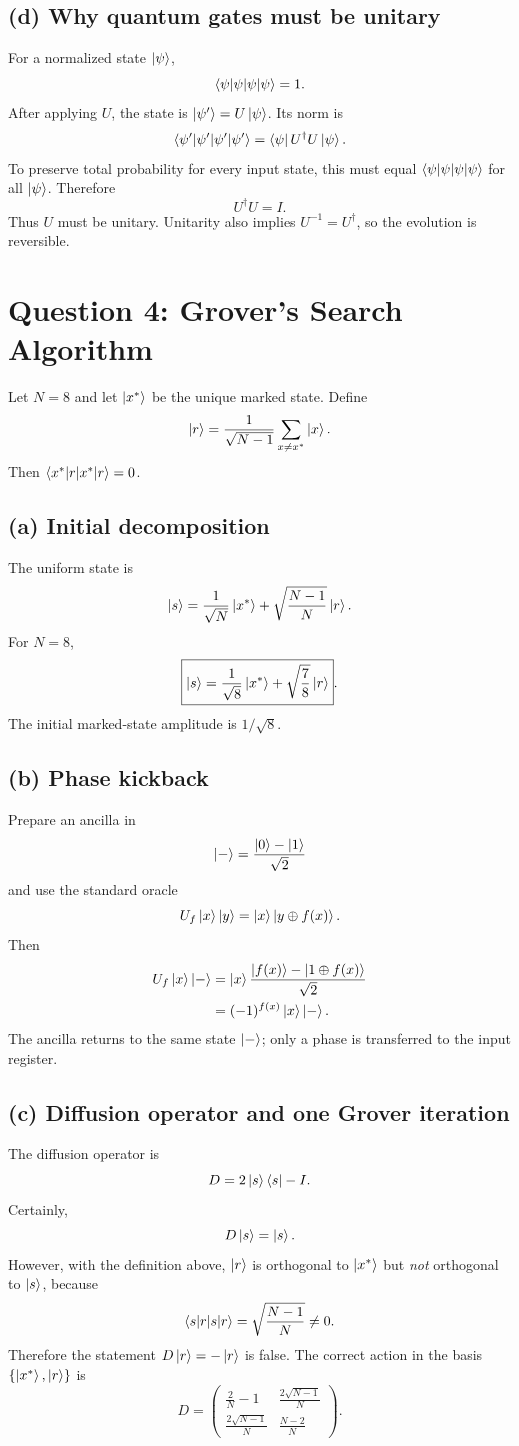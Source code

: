 \documentclass[11pt,a4paper]{article}
\begin{document}
\subsection*{(d) Why quantum gates must be unitary}
For a normalized state $\ket\psi$,
\[
\braket{\psi|\psi}=1.
\]
After applying $U$, the state is $\ket{\psi'}=U\ket\psi$. Its norm is
\[
\braket{\psi'|\psi'}
=\bra\psi U^\dagger U\ket\psi.
\]
To preserve total probability for every input state, this must equal
$\braket{\psi|\psi}$ for all $\ket\psi$. Therefore
\[
U^\dagger U=I.
\]
Thus $U$ must be unitary. Unitarity also implies $U^{-1}=U^\dagger$, so the evolution is reversible.

\newpage
\section*{Question 4: Grover's Search Algorithm}

Let $N=8$ and let $\ket{x^*}$ be the unique marked state. Define
\[
\ket{r}=\frac1{\sqrt{N-1}}\sum_{x\ne x^*}\ket{x}.
\]
Then $\braket{x^*|r}=0$.

\subsection*{(a) Initial decomposition}
The uniform state is
\[
\ket{s}=\frac1{\sqrt N}\ket{x^*}
+\sqrt{\frac{N-1}{N}}\ket r.
\]
For $N=8$,
\[
\boxed{\ket{s}=\frac1{\sqrt8}\ket{x^*}+\sqrt{\frac78}\ket r}.
\]
The initial marked-state amplitude is $1/\sqrt8$.

\subsection*{(b) Phase kickback}
Prepare an ancilla in
\[
\ket- =\frac{\ket0-\ket1}{\sqrt2}
\]
and use the standard oracle
\[
U_f\ket{x}\ket y=\ket{x}\ket{y\oplus f(x)}.
\]
Then
\begin{align*}
U_f\ket{x}\ket-
&=\ket{x}\frac{\ket{f(x)}-\ket{1\oplus f(x)}}{\sqrt2}\\
&=(-1)^{f(x)}\ket{x}\ket-.
\end{align*}
The ancilla returns to the same state $\ket-$; only a phase is transferred to the input register.

\subsection*{(c) Diffusion operator and one Grover iteration}
The diffusion operator is
\[
D=2\ket{s}\bra{s}-I.
\]
Certainly,
\[
D\ket{s}=\ket{s}.
\]
However, with the definition above, $\ket r$ is orthogonal to $\ket{x^*}$ but
\emph{not} orthogonal to $\ket s$, because
\[
\braket{s|r}=\sqrt{\frac{N-1}{N}}\ne0.
\]
Therefore the statement $D\ket r=-\ket r$ is false. The correct action in the basis
$\{\ket{x^*},\ket r\}$ is
\[
D=
\begin{pmatrix}
\frac{2}{N}-1 & \frac{2\sqrt{N-1}}{N}\\[3pt]
\frac{2\sqrt{N-1}}{N} & \frac{N-2}{N}
\end{pmatrix}.
\]
\end{document}
